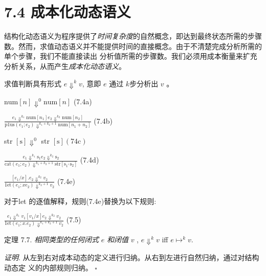 \section{7.4 成本化动态语义}%

结构化动态语义为程序提供了{\it 时间复杂度}的自然概念，即达到最终状态所需的步骤数。然而，求值动态语义并不能提供时间的直接概念。由于不清楚完成分析所需的单个步骤，我们不能直接读出
分析值所需的步骤数。我们必须用成本衡量来扩充分析关系，从而产生{\it 成本化动态语义}。 

求值判断具有形式 $e\Downarrow^{k}v$, 意即 $e$ 通过 $k$步分析出 $v$ 。
\begin{center}
$\mathrm{n}\mathrm{u}\mathrm{m}[n]\Downarrow^{0}\mathrm{n}\mathrm{u}\mathrm{m}[n]$   (7.4a)
\end{center}

\begin{center}
$\displaystyle \frac{e_{1}\Downarrow^{k_{1}}\mathrm{n}\mathrm{u}\mathrm{m}[n_{1}]e_{2}\Downarrow^{k_{2}}\mathrm{n}\mathrm{u}\mathrm{m}[n_{2}]}{\mathrm{p}1\mathrm{u}\mathrm{s}(e_{1};e_{2})\Downarrow^{k_{1}+k_{2}+1}\mathrm{n}\mathrm{u}\mathrm{m}[n_{1}+n_{2}]}$   (7.4b)
\end{center}
str $[\mathrm{s}] \Downarrow^{0}$ str $[\mathrm{s}] (74\mathrm{c})$
\begin{center}
$\displaystyle \frac{e_{1}\Downarrow^{k_{1}}\mathrm{s}_{1}e_{2}\Downarrow^{k_{2}}\mathrm{s}_{2}}{\mathrm{c}\mathrm{a}\mathrm{t}(e_{1};e_{2})\Downarrow^{k_{1}+k_{2}+1}\mathrm{s}\mathrm{t}\mathrm{r}[\mathrm{s}_{1^{\wedge}}\mathrm{s}_{2}]}$   (7.4d)

$\displaystyle \frac{[e_{1}/x].e_{2}\Downarrow^{k_{2}}v_{2}}{1\mathrm{e}\mathrm{t}(e_{1};xe_{2})\Downarrow^{k_{2}+1}v_{2}}$   (7.4e)
\end{center}
对于let 的逐值解释，规则(7.4e)替换为以下规则:
\begin{center}
$\displaystyle \frac{e_{1}\Downarrow^{k_{1}}v_{1}[v_{1}/x]e_{2}\Downarrow^{k_{2}}v_{2}}{1\mathrm{e}\mathrm{t}(e_{1};x.e_{2})\Downarrow^{k_{1}+k_{2}+1}v_{2}}$   (7.5)
\end{center}
定理 7.7. {\it 相同类型的任何闭式} $e$ {\it 和闭值} $v$ , $e\Downarrow^{k}v$ iff $e\mapsto^{k}v.$%

{\it 证明}. 从左到右对成本动态的定义进行归纳。从右到左进行自然归纳，通过对结构动态定
义的内部规则归纳。 $\square $

